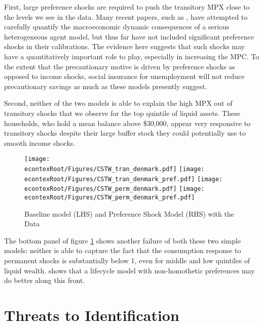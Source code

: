 \documentclass[titlepage]{\econtex}\newcommand{\texname}{ConsumptionHeterogeneity}
\begin{document}
First, large preference shocks are required to push the transitory MPX close to the levels we see in the data. Many recent papers, such as \cite{krueger_macroeconomics_2016}, have attempted to carefully quantify the macroeconomic dynamic consequences of a serious heterogeneous agent model, but thus far have not included significant preference shocks in their calibrations. The evidence here suggests that such shocks may have a quantitatively important role to play, especially in increasing the MPC. To the extent that the precautionary motive is driven by preference shocks as opposed to income shocks, social insurance for unemployment will not reduce precautionary savings as much as these models presently suggest.

Second, neither of the two models is able to explain the high MPX out of transitory shocks that we observe for the top quintile of liquid assets. These households, who hold a mean balance above \$30,000, appear very responsive to transitory shocks despite their large buffer stock they could potentially use to smooth income shocks.
\begin{figure} 
	\begin{centering}
		\texttt{[image: \\econtexRoot/Figures/CSTW\_tran\_denmark.pdf]}
		\texttt{[image: \\econtexRoot/Figures/CSTW\_tran\_denmark\_pref.pdf]}
		\texttt{[image: \\econtexRoot/Figures/CSTW\_perm\_denmark.pdf]}
\texttt{[image: \\econtexRoot/Figures/CSTW\_perm\_denmark\_pref.pdf]}
		\caption{Baseline model (LHS) and Preference Shock Model (RHS) with the Data}
		\label{fig:CSTW}
	\end{centering}
\end{figure}

The bottom panel of figure \ref{fig:CSTW} shows another failure of both these two simple models: neither is able to capture the fact that the consumption response to permanent shocks is substantially below 1, even for middle and low quintiles of liquid wealth. \cite{straub_consumption_2018} shows that a lifecycle model with non-homothetic preferences may do better along this front.

\section{Threats to Identification}
\label{threats_to_identification}
\end{document}
